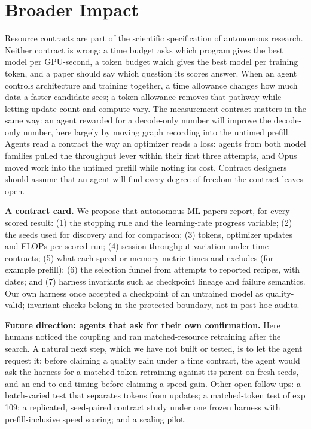 \documentclass{article}
\begin{document}
\section{Broader Impact}\label{partthree}
Resource contracts are part of the scientific specification of autonomous research. Neither contract is wrong: a time budget asks which program gives the best model per GPU-second, a token budget which gives the best model per training token, and a paper should say which question its scores answer. When an agent controls architecture and training together, a time allowance changes how much data a faster candidate sees; a token allowance removes that pathway while letting update count and compute vary. The measurement contract matters in the same way: an agent rewarded for a decode-only number will improve the decode-only number, here largely by moving graph recording into the untimed prefill. Agents read a contract the way an optimizer reads a loss: agents from both model families pulled the throughput lever within their first three attempts, and Opus moved work into the untimed prefill while noting its cost. Contract designers should assume that an agent will find every degree of freedom the contract leaves open.

\textbf{A contract card.} We propose that autonomous-ML papers report, for every scored result: (1) the stopping rule and the learning-rate progress variable; (2) the seeds used for discovery and for comparison; (3) tokens, optimizer updates and FLOPs per scored run; (4) session-throughput variation under time contracts; (5) what each speed or memory metric times and excludes (for example prefill); (6) the selection funnel from attempts to reported recipes, with dates; and (7) harness invariants such as checkpoint lineage and failure semantics. Our own harness once accepted a checkpoint of an untrained model as quality-valid; invariant checks belong in the protected boundary, not in post-hoc audits.

\textbf{Future direction: agents that ask for their own confirmation.} Here humans noticed the coupling and ran matched-resource retraining after the search. A natural next step, which we have not built or tested, is to let the agent request it: before claiming a quality gain under a time contract, the agent would ask the harness for a matched-token retraining against its parent on fresh seeds, and an end-to-end timing before claiming a speed gain. Other open follow-ups: a batch-varied test that separates tokens from updates; a matched-token test of exp 109; a replicated, seed-paired contract study under one frozen harness with prefill-inclusive speed scoring; and a scaling pilot.
\end{document}
